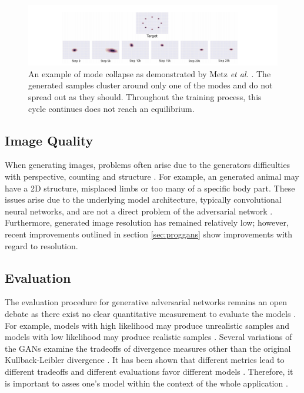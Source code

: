 \documentclass[11pt]{article}
\begin{document}
\begin{figure}
\centering
\includegraphics[scale=0.8]{modecollapse}
\caption{An example of mode collapse as demonstrated by Metz \textit{et al.} \citep{2016arXiv161102163M}. The generated samples cluster around only one of the modes and do not spread out as they should. Throughout the training process, this cycle continues does not reach an equilibrium.}
\label{fig:modecollapse}
\end{figure}

\subsection{Image Quality}
When generating images, problems often arise due to the generators difficulties with perspective, counting and structure \citep{2017arXiv170100160G}. For example, an generated animal may  have a 2D structure, misplaced limbs or too many of a specific body part. These issues arise due to the underlying model architecture, typically convolutional neural networks, and are not a direct problem of the adversarial network \citep{2017arXiv170100160G}. Furthermore, generated image resolution has remained relatively low; however, recent improvements outlined in section \ref{sec:proggans} show improvements with regard to resolution.

\subsection{Evaluation}
The evaluation procedure for generative adversarial networks remains an open debate as there exist no clear quantitative measurement to evaluate the models \citep{2017arXiv170100160G}. For example, models with high likelihood may produce unrealistic samples and models with low likelihood may produce realistic samples \citep{2017arXiv170100160G}. Several variations of the GANs examine the tradeoffs of divergence measures other than the original Kullback-Leibler divergence \citep{2015arXiv151101844T}. It has been shown that different metrics lead to different tradeoffs and different evaluations favor different models \citep{2015arXiv151101844T}. Therefore, it is important to asses one's model within the context of the whole application \citep{2015arXiv151101844T}.
\end{document}
